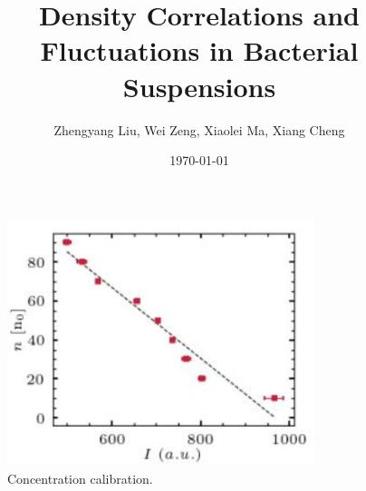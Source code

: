 \documentclass[11px]{article}
\title{Density Correlations and Fluctuations in Bacterial Suspensions}
\author{Zhengyang Liu, Wei Zeng, Xiaolei Ma, Xiang Cheng}
\date{\today}
\begin{document}
\maketitle

\begin{figure}[h]
\begin{center}
\includegraphics[width=0.8\textwidth]{fig-s1_conc-calibration.jpg}
\caption[]{Concentration calibration.}
\end{center}
\end{figure}
\label{fig:s1}
\end{document}
